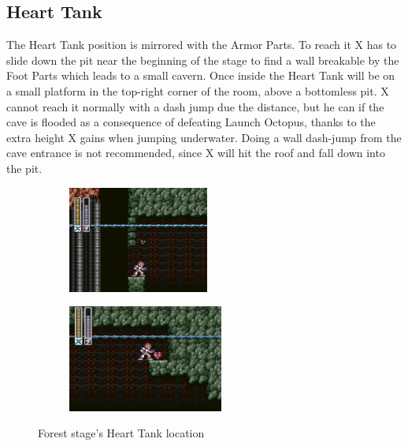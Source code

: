 \subsection{Heart Tank}
The Heart Tank position is mirrored with the Armor Parts. To reach it X has to slide down the pit near the beginning of the stage to find a wall breakable by the Foot Parts which leads to a small cavern. Once inside the Heart Tank will be on a small platform in the top-right corner of the room, above a bottomless pit. X cannot reach it normally with a dash jump due the distance, but he can if  the cave is flooded as a consequence of defeating Launch Octopus, thanks to the extra height X gains when jumping underwater. Doing a wall dash-jump from the cave entrance is not recommended, since X will hit the roof and fall down into the pit.
\begin{figure}[htp]
	\centering
	\begin{subfigure}{0.45\linewidth}
		\centering
		\includegraphics[height=3.5cm]{figures/X1/Sting_chameleon/Sting_heart_1.jpg}
	\end{subfigure}
	\begin{subfigure}{0.45\linewidth}
		\centering
		\includegraphics[height=3.5cm]{figures/X1/Sting_chameleon/Sting_heart_2.jpg}
	\end{subfigure}
	\caption{Forest stage's Heart Tank location}
\end{figure}

